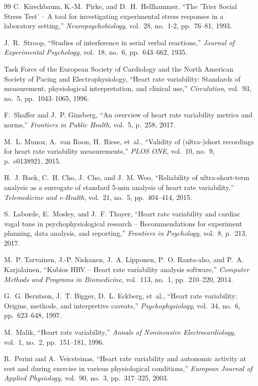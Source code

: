 \documentclass[12pt,a4paper,oneside]{report}
\begin{document}
\begin{thebibliography}{99}
C.~Kirschbaum, K.-M.~Pirke, and D.~H.~Hellhammer, ``The 'Trier Social Stress Test' -- A tool for investigating experimental stress responses in a laboratory setting,'' \emph{Neuropsychobiology}, vol.~28, no.~1-2, pp.~76--81, 1993.

J.~R.~Stroop, ``Studies of interference in serial verbal reactions,'' \emph{Journal of Experimental Psychology}, vol.~18, no.~6, pp.~643--662, 1935.

{Task Force of the European Society of Cardiology and the North American Society of Pacing and Electrophysiology}, ``Heart rate variability: Standards of measurement, physiological interpretation, and clinical use,'' \emph{Circulation}, vol.~93, no.~5, pp.~1043--1065, 1996.

F.~Shaffer and J.~P. Ginsberg, ``An overview of heart rate variability metrics and norms,'' \emph{Frontiers in Public Health}, vol.~5, p.~258, 2017.

M.~L. Munoz, A.~van Roon, H.~Riese, et~al., ``Validity of (ultra-)short recordings for heart rate variability measurements,'' \emph{PLOS ONE}, vol.~10, no.~9, p.~e0138921, 2015.

H.~J. Baek, C.~H. Cho, J.~Cho, and J.~M. Woo, ``Reliability of ultra-short-term analysis as a surrogate of standard 5-min analysis of heart rate variability,'' \emph{Telemedicine and e-Health}, vol.~21, no.~5, pp.~404--414, 2015.

S.~Laborde, E.~Mosley, and J.~F. Thayer, ``Heart rate variability and cardiac vagal tone in psychophysiological research -- Recommendations for experiment planning, data analysis, and reporting,'' \emph{Frontiers in Psychology}, vol.~8, p.~213, 2017.

M.~P. Tarvainen, J.-P. Niskanen, J.~A. Lipponen, P.~O. Ranta-aho, and P.~A. Karjalainen, ``Kubios HRV -- Heart rate variability analysis software,'' \emph{Computer Methods and Programs in Biomedicine}, vol.~113, no.~1, pp.~210--220, 2014.

G.~G. Berntson, J.~T. Bigger, D.~L. Eckberg, et~al., ``Heart rate variability: Origins, methods, and interpretive caveats,'' \emph{Psychophysiology}, vol.~34, no.~6, pp.~623--648, 1997.

M.~Malik, ``Heart rate variability,'' \emph{Annals of Noninvasive Electrocardiology}, vol.~1, no.~2, pp.~151--181, 1996.

R.~Perini and A.~Veicsteinas, ``Heart rate variability and autonomic activity at rest and during exercise in various physiological conditions,'' \emph{European Journal of Applied Physiology}, vol.~90, no.~3, pp.~317--325, 2003.

\end{thebibliography}
\end{document}
